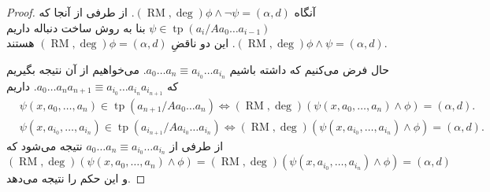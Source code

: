 \documentclass[12pt,a4paper]{report}
\theoremstyle{colorhead}
\DeclareMathOperator{\RM}{RM}
\DeclareMathOperator{\tp}{tp}
\begin{document}
\begin{proof}
آنگاه 
$(\RM,\deg)\phi \wedge\neg \psi =(\alpha,d)$.
از طرفی از آنجا که 
$\psi\in \tp(a_i/Aa_0\ldots a_{i-1})$
بنا به روش ساخت دنباله‌ داریم
$(\RM,\deg) \phi\wedge\psi =(\alpha,d)$.
این دو
ناقضِ
$(\RM,\deg)\phi=(\alpha,d)$
هستند.
\par 
حال فرض می‌کنیم که داشته باشیم
$a_0\ldots a_{n}\equiv a_{i_0}\ldots a_{i_n}$.
می‌خواهیم از آن نتیجه بگیریم که
$a_0\ldots a_{n}a_{n+1}\equiv a_{i_0}\ldots a_{i_n}a_{i_{n+1}}$.
داریم
\begin{align*}
& 
\psi(x,a_0,\ldots, a_n)\in \tp(a_{n+1}/Aa_0\ldots a_n) \Leftrightarrow
(\RM,\deg)(\psi(x,a_0,\ldots, a_n)\wedge\phi)=(\alpha,d).
\\
&
\psi(x,a_{i_0},\ldots, a_{i_n})\in \tp(a_{i_{n+1}}/Aa_{i_0}\ldots a_{i_n}) \Leftrightarrow
(\RM,\deg)(\psi(x,a_{i_0},\ldots, a_{i_n})\wedge\phi)=(\alpha,d).
\end{align*}
از طرفی از
$a_0\ldots a_n\equiv a_{i_0}\ldots a_{i_n}$
نتیجه می‌شود که
\[
(\RM,\deg)(\psi(x,a_0,\ldots, a_n)\wedge\phi)=
(\RM,\deg)(\psi(x,a_{i_0},\ldots, a_{i_n})\wedge\phi)=(\alpha,d)
\]
و این حکم را نتیجه می‌دهد.
\end{proof}
\end{document}
